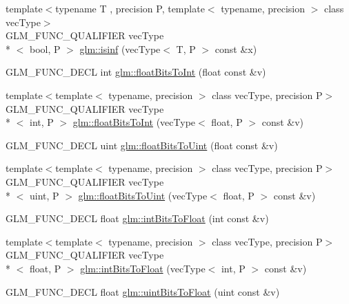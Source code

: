 \begin{DoxyCompactItemize}
\item 
{\footnotesize template$<$typename T , precision P, template$<$ typename, precision $>$ class vec\-Type$>$ }\\G\-L\-M\-\_\-\-F\-U\-N\-C\-\_\-\-Q\-U\-A\-L\-I\-F\-I\-E\-R vec\-Type\\*
$<$ bool, P $>$ \hyperlink{group__core__func__common_gaf28f7a4696746f081685c9fd05c7e2de}{glm\-::isinf} (vec\-Type$<$ T, P $>$ const \&x)
\item 
G\-L\-M\-\_\-\-F\-U\-N\-C\-\_\-\-D\-E\-C\-L int \hyperlink{group__core__func__common_gadc6a536a7bef046c3293d2ccad6d9ca2}{glm\-::float\-Bits\-To\-Int} (float const \&v)
\item 
{\footnotesize template$<$template$<$ typename, precision $>$ class vec\-Type, precision P$>$ }\\G\-L\-M\-\_\-\-F\-U\-N\-C\-\_\-\-Q\-U\-A\-L\-I\-F\-I\-E\-R vec\-Type\\*
$<$ int, P $>$ \hyperlink{group__core__func__common_gac4a0710238ae54c67931dd29a0b0f873}{glm\-::float\-Bits\-To\-Int} (vec\-Type$<$ float, P $>$ const \&v)
\item 
G\-L\-M\-\_\-\-F\-U\-N\-C\-\_\-\-D\-E\-C\-L uint \hyperlink{group__core__func__common_ga748b4d2819b48d28ca09dc8733488873}{glm\-::float\-Bits\-To\-Uint} (float const \&v)
\item 
{\footnotesize template$<$template$<$ typename, precision $>$ class vec\-Type, precision P$>$ }\\G\-L\-M\-\_\-\-F\-U\-N\-C\-\_\-\-Q\-U\-A\-L\-I\-F\-I\-E\-R vec\-Type\\*
$<$ uint, P $>$ \hyperlink{group__core__func__common_ga1804d4c443605d8a27be644aa461afe4}{glm\-::float\-Bits\-To\-Uint} (vec\-Type$<$ float, P $>$ const \&v)
\item 
G\-L\-M\-\_\-\-F\-U\-N\-C\-\_\-\-D\-E\-C\-L float \hyperlink{group__core__func__common_ga2650dc57b2148a6ffbce20944fb4d97a}{glm\-::int\-Bits\-To\-Float} (int const \&v)
\item 
{\footnotesize template$<$template$<$ typename, precision $>$ class vec\-Type, precision P$>$ }\\G\-L\-M\-\_\-\-F\-U\-N\-C\-\_\-\-Q\-U\-A\-L\-I\-F\-I\-E\-R vec\-Type\\*
$<$ float, P $>$ \hyperlink{group__core__func__common_gad21ab176dd0e6b59d923db5efca87f4e}{glm\-::int\-Bits\-To\-Float} (vec\-Type$<$ int, P $>$ const \&v)
\item 
G\-L\-M\-\_\-\-F\-U\-N\-C\-\_\-\-D\-E\-C\-L float \hyperlink{group__core__func__common_ga97464ca9ff4267de30ea408f700d4ca8}{glm\-::uint\-Bits\-To\-Float} (uint const \&v)

\end{DoxyCompactItemize}
